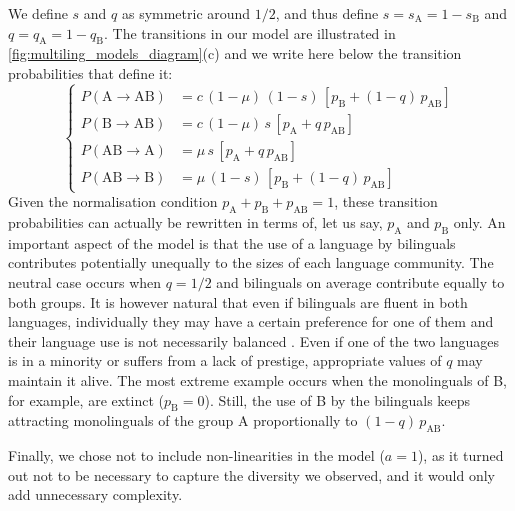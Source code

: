 \documentclass[../thesis.tex]{subfiles}
\begin{document}
We define $s$ and $q$ as symmetric around $1/2$, and thus define $s = s_\text{A} = 1 -
s_\text{B}$ and $q = q_\text{A} = 1 - q_\text{B}$. The transitions in our model are
illustrated in \cref{fig:multiling_models_diagram}(c) and we write here below the transition
probabilities that define it:
\begin{equation}
\label{eq:bipref_model}
\left\{
\begin{aligned}
  P (\text{A} \rightarrow \text{AB}) &= c \, (1 - \mu) \, (1-s) \, \left[ p_{\text{B}} + (1-q) \,  p_{\text{AB}} \right] \\
  P (\text{B} \rightarrow \text{AB}) &= c \, (1 - \mu) \, s \, \left[ p_{\text{A}} + q \, p_{\text{AB}} \right] \\
  P (\text{AB} \rightarrow \text{A}) &= \mu \, s \, \left[ p_{\text{A}} + q \, p_{\text{AB}} \right] \\
  P (\text{AB} \rightarrow \text{B}) &= \mu \, (1-s) \, \left[ p_{\text{B}} + (1-q) \, p_{\text{AB}} \right]
\end{aligned}
\right.
\end{equation}
Given the normalisation condition $p_\text{A} + p_\text{B} + p_\text{AB} = 1$, these
transition probabilities can actually be rewritten in terms of, let us say, $p_\text{A}$
and $p_\text{B}$ only. An important aspect of the model is that the use of a language by
bilinguals contributes potentially unequally to the sizes of each language community.
The neutral case occurs when $q = 1/2$ and bilinguals on average contribute equally to
both groups. It is however natural that even if bilinguals are fluent in both languages,
individually they may have a certain preference for one of them and their language use
is not necessarily balanced \cite{RomaineBilingualMultilingual2012}. Even if one of the
two languages is in a minority or suffers from a lack of prestige, appropriate values of
$q$ may maintain it alive. The most extreme example occurs when the monolinguals of B,
for example, are extinct ($p_{\text{B}} = 0$). Still, the use of B by the bilinguals
keeps attracting monolinguals of the group A proportionally to $(1-q)\, p_{\text{AB}}$.

Finally, we chose not to include non-linearities in the model ($a = 1$), as it turned
out not to be necessary to capture the diversity we observed, and it would only add
unnecessary complexity.
\end{document}
